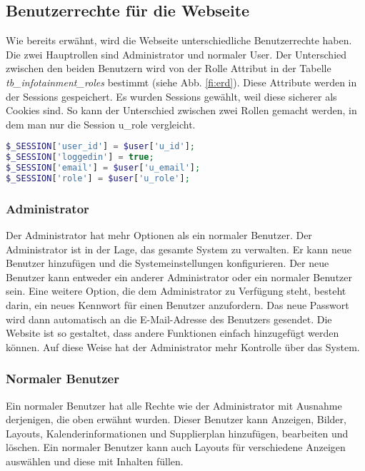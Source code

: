 \subsection{Benutzerrechte für die Webseite}
Wie bereits erwähnt, wird die Webseite unterschiedliche Benutzerrechte haben. Die zwei Hauptrollen sind Administrator und normaler User. Der Unterschied zwischen den beiden Benutzern wird von der Rolle Attribut in der Tabelle \textit{tb\_infotainment\_roles} bestimmt (siehe Abb. \ref{fi:erd}). Diese Attribute werden in der Sessions gespeichert. Es wurden Sessions gewählt, weil diese sicherer als Cookies sind. \cite{40_sessions_cookies} So kann der Unterschied zwischen zwei Rollen gemacht werden, in dem man nur die Session u\_role vergleicht.
\begin{lstlisting}[caption={Speicherung der Benutzerinformationen in Sessions},label={lst:sessions},language=PHP]
$_SESSION['user_id'] = $user['u_id'];
$_SESSION['loggedin'] = true;
$_SESSION['email'] = $user['u_email'];
$_SESSION['role'] = $user['u_role'];
\end{lstlisting}

\subsubsection{Administrator}
Der Administrator hat mehr Optionen als ein normaler Benutzer. Der Administrator ist in der Lage, das gesamte System zu verwalten. Er kann neue Benutzer hinzufügen und die Systemeinstellungen konfigurieren. Der neue Benutzer kann entweder ein anderer Administrator oder ein normaler Benutzer sein. Eine weitere Option, die dem Administrator zu Verfügung steht, besteht darin, ein neues Kennwort für einen Benutzer anzufordern. Das neue Passwort wird dann automatisch an die E-Mail-Adresse des Benutzers gesendet. Die Website ist so gestaltet, dass andere Funktionen einfach hinzugefügt werden können. Auf diese Weise hat der Administrator mehr Kontrolle über das System.

\subsubsection{Normaler Benutzer}
Ein normaler Benutzer hat alle Rechte wie der Administrator mit Ausnahme derjenigen, die oben erwähnt wurden. Dieser Benutzer kann Anzeigen, Bilder, Layouts, Kalenderinformationen und Supplierplan hinzufügen, bearbeiten und löschen. Ein normaler Benutzer kann auch Layouts für verschiedene Anzeigen auswählen und diese mit Inhalten füllen.


